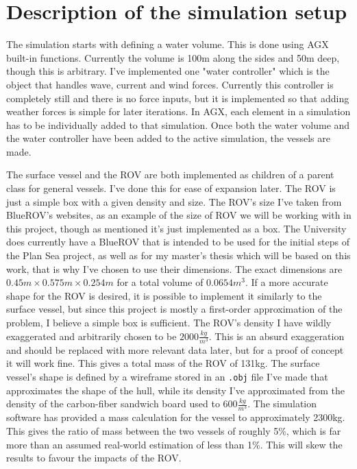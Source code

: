 \section{Description of the simulation setup}
The simulation starts with defining a water volume. This is done using AGX built-in functions. Currently the volume is 100m along the sides and 50m deep, though this is arbitrary. I've implemented one "water controller" which is the object that handles wave, current and wind forces. Currently this controller is completely still and there is no force inputs, but it is implemented so that adding weather forces is simple for later iterations. In AGX, each element in a simulation has to be individually added to that simulation. Once both the water volume and the water controller have been added to the active simulation, the vessels are made.

The surface vessel and the ROV are both implemented as children of a parent class for general vessels. I've done this for ease of expansion later. The ROV is just a simple box with a given density and size. The ROV's size I've taken from BlueROV's websites\cite{noauthor_bluerov2_nodate}, as an example of the size of ROV we will be working with in this project, though as mentioned it's just implemented as a box. The University does currently have a BlueROV that is intended to be used for the initial steps of the Plan Sea project, as well as for my master's thesis which will be based on this work, that is why I've chosen to use their dimensions. The exact dimensions are \(0.45m \times 0.575m \times 0.254m\) for a total volume of \(0.0654m^3\). If a more accurate shape for the ROV is desired, it is possible to implement it similarly to the surface vessel, but since this project is mostly a first-order approximation of the problem, I believe a simple box is sufficient. The ROV's density I have wildly exaggerated and arbitrarily chosen to be \(2000\frac{kg}{m^3}\). This is an absurd exaggeration and should be replaced with more relevant data later, but for a proof of concept it will work fine. This gives a total mass of the ROV of 131kg. The surface vessel's shape is defined by a wireframe stored in an \texttt{.obj} file I've made that approximates the shape of the hull, while its density I've approximated from the density of the carbon-fiber sandwich board used to \(600\frac{kg}{m^3}\). The simulation software has provided a mass calculation for the vessel to approximately 2300kg. This gives the ratio of mass between the two vessels of roughly 5\%, which is far more than an assumed real-world estimation of less than 1\%. This will skew the results to favour the impacts of the ROV. 

